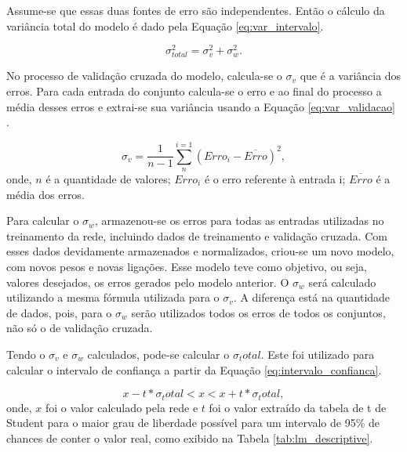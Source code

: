 Assume-se que essas duas fontes de erro são independentes. Então o cálculo da variância total do modelo é dado pela Equação \ref{eq:var_intervalo}.

\begin{equation}
\label{eq:var_intervalo}
\sigma^{2}_{total} = \sigma^{2}_{v} + \sigma^{2}_{w}.
\end{equation}

No processo de validação cruzada do modelo, calcula-se o $\sigma_v$ que é a variância dos erros. Para cada entrada do conjunto calcula-se o erro e ao final do processo a média desses erros e extrai-se sua variância usando a Equação \ref{eq:var_validacao} \label{symbol:var_validacao}.

\begin{equation}
\label{eq:var_validacao}
\sigma_v = \frac{1}{n-1} \sum_{n}^{i=1} (Erro_i - \overline{Erro})^2 , 
\end{equation}
onde, $n$ é a quantidade de valores; $Erro_i$ é o erro referente à entrada i; $\overline{Erro}$ é a média dos erros.

Para calcular o $\sigma_w$, armazenou-se os erros para todas as entradas utilizadas no treinamento da rede, incluindo dados de treinamento e validação cruzada. Com esses dados devidamente armazenados e normalizados, criou-se um novo modelo, com novos pesos e novas ligações. Esse modelo teve como objetivo, ou seja, valores desejados, os erros gerados pelo modelo anterior. O $\sigma_w$ será calculado utilizando a mesma fórmula utilizada para o $\sigma_v$. A diferença está na quantidade de dados, pois, para o $\sigma_w$ serão utilizados todos os erros de todos os conjuntos, não só o de validação cruzada.

Tendo o $\sigma_v$ e $\sigma_w$ calculados, pode-se calcular o $\sigma_total$. Este foi utilizado para calcular o intervalo de confiança a partir da Equação \ref{eq:intervalo_confianca}.

\begin{equation}
\label{eq:intervalo_confianca}
x - t * \sigma_total < x < x + t * \sigma_total , 
\end{equation}
onde, $x$ foi o valor calculado pela rede e $t$ foi o valor extraído da tabela de t de Student para o maior grau de liberdade possível para um intervalo de 95\% de chances de conter o valor real, como exibido na Tabela \ref{tab:lm_descriptive}.

